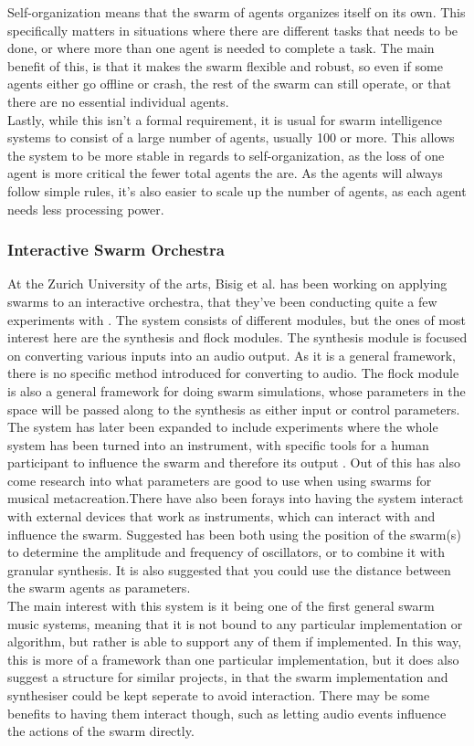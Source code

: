 \documentclass[a4paper,english]{report}
\begin{document}
	Self-organization means that the swarm of agents organizes itself on its own. This specifically matters in situations where there are different tasks that needs to be done, or where more than one agent is needed to complete a task. The main benefit of this, is that it makes the swarm flexible and robust, so even if some agents either go offline or crash, the rest of the swarm can still operate, or that there are no essential individual agents.\\
	Lastly, while this isn't a formal requirement, it is usual for swarm intelligence systems to consist of a large number of agents, usually 100 or more. This allows the system to be more stable in regards to self-organization, as the loss of one agent is more critical the fewer total agents the are. As the agents will always follow simple rules, it's also easier to scale up the number of agents, as each agent needs less processing power.
	
	\subsubsection{Interactive Swarm Orchestra}
	At the Zurich University of the arts, Bisig et al. has been working on applying swarms to an interactive orchestra, that they've been conducting quite a few experiments with \cite{bisig2008interactive}. The system consists of different modules, but the ones of most interest here are the synthesis and flock modules. The synthesis module is focused on converting various inputs into an audio output. As it is a general framework, there is no specific method introduced for converting to audio. The flock module is also a general framework for doing swarm simulations, whose parameters in the space will be passed along to the synthesis as either input or control parameters.\\
	The system has later been expanded to include experiments where the whole system has been turned into an instrument, with specific tools for a human participant to influence the swarm and therefore its output \cite{bisig2012tools}. Out of this has also come research into what parameters are good to use when using swarms for musical metacreation.There have also been forays into having the system interact with external devices that work as instruments, which can interact with and influence the swarm. Suggested has been both using the position of the swarm(s) to determine the amplitude and frequency of oscillators, or to combine it with granular synthesis. It is also suggested that you could use the distance between the swarm agents as parameters.\\
	The main interest with this system is it being one of the first general swarm music systems, meaning that it is not bound to any particular implementation or algorithm, but rather is able to support any of them if implemented. In this way, this is more of a framework than one particular implementation, but it does also suggest a structure for similar projects, in that the swarm implementation and synthesiser could be kept seperate to avoid interaction. There may be some benefits to having them interact though, such as letting audio events influence the actions of the swarm directly.
	
\end{document}
